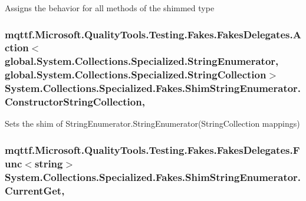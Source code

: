 Assigns the behavior for all methods of the shimmed type

\hypertarget{class_system_1_1_collections_1_1_specialized_1_1_fakes_1_1_shim_string_enumerator_a35fd62dfd891b2535e606aa79f12cf95}{
\subsubsection[{Constructor\-String\-Collection}]{\setlength{\rightskip}{0pt plus 5cm}mqttf.\-Microsoft.\-Quality\-Tools.\-Testing.\-Fakes.\-Fakes\-Delegates.\-Action$<$global.\-System.\-Collections.\-Specialized.\-String\-Enumerator, global.\-System.\-Collections.\-Specialized.\-String\-Collection$>$ System.\-Collections.\-Specialized.\-Fakes.\-Shim\-String\-Enumerator.\-Constructor\-String\-Collection\hspace{0.3cm}{\ttfamily [static]}, {\ttfamily [set]}}}\label{class_system_1_1_collections_1_1_specialized_1_1_fakes_1_1_shim_string_enumerator_a35fd62dfd891b2535e606aa79f12cf95}


Sets the shim of String\-Enumerator.\-String\-Enumerator(\-String\-Collection mappings)

\hypertarget{class_system_1_1_collections_1_1_specialized_1_1_fakes_1_1_shim_string_enumerator_ac127b2dd8625a0c8515d796c6679c39a}{
\subsubsection[{Current\-Get}]{\setlength{\rightskip}{0pt plus 5cm}mqttf.\-Microsoft.\-Quality\-Tools.\-Testing.\-Fakes.\-Fakes\-Delegates.\-Func$<$string$>$ System.\-Collections.\-Specialized.\-Fakes.\-Shim\-String\-Enumerator.\-Current\-Get\hspace{0.3cm}{\ttfamily [get]}, {\ttfamily [set]}}}\label{class_system_1_1_collections_1_1_specialized_1_1_fakes_1_1_shim_string_enumerator_ac127b2dd8625a0c8515d796c6679c39a}


